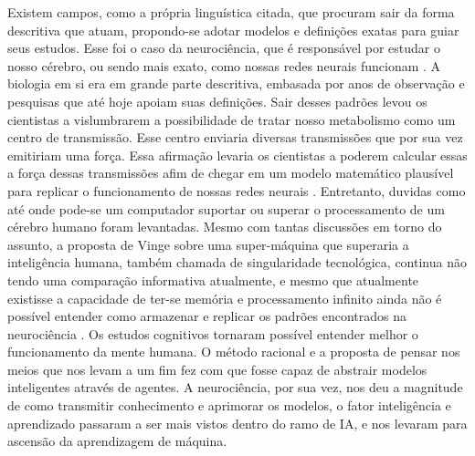 Existem campos, como a própria linguística citada, que procuram sair da forma descritiva que atuam, propondo-se adotar modelos e definições exatas para guiar seus estudos. Esse foi o caso da neurociência, que é responsável por estudar o nosso cérebro, ou sendo mais exato, como nossas redes neurais funcionam \cite[10]{russell2003artificial}. A biologia em si era em grande parte descritiva, embasada por anos de observação e pesquisas que até hoje apoiam suas definições. Sair desses padrões levou os cientistas a vislumbrarem a possibilidade de tratar nosso metabolismo como um centro de transmissão. Esse centro enviaria diversas transmissões que por sua vez emitiriam uma força. Essa afirmação levaria os cientistas a poderem calcular essas a força dessas transmissões afim de chegar em um modelo matemático plausível para replicar o funcionamento de nossas redes neurais \cite[1-3]{rashevsky1960mathematical}. Entretanto, duvidas como até onde pode-se um computador suportar ou superar o processamento de um cérebro humano foram levantadas. Mesmo com tantas discussões em torno do assunto, a proposta de Vinge sobre uma super-máquina que superaria a inteligência humana, também chamada de singularidade tecnológica, continua não tendo uma comparação informativa atualmente, e mesmo que atualmente existisse a capacidade de ter-se memória e processamento infinito ainda não é possível entender como armazenar e replicar os padrões encontrados na neurociência \cite[11-12]{vinge1993coming,russell2003artificial}. Os estudos cognitivos tornaram possível entender melhor o funcionamento da mente humana. O método racional e a proposta de pensar nos meios que nos levam a um fim fez com que fosse capaz de abstrair modelos inteligentes através de agentes. A neurociência, por sua vez, nos deu a magnitude de como transmitir conhecimento e aprimorar os modelos, o fator inteligência e aprendizado passaram a ser mais vistos dentro do ramo de IA, e nos levaram para ascensão da aprendizagem de máquina.

